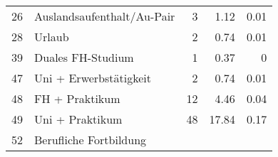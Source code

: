 \begin{longtable}{lXrrr}
     26 &
     \multicolumn{1}{X}{ Auslandsaufenthalt/Au-Pair   } &


       \num{3} &
       \num[round-mode=places,round-precision=2]{1,12} &
         \num[round-mode=places,round-precision=2]{0,01} \\

     28 &
     \multicolumn{1}{X}{ Urlaub   } &


       \num{2} &
       \num[round-mode=places,round-precision=2]{0,74} &
         \num[round-mode=places,round-precision=2]{0,01} \\

     39 &
     \multicolumn{1}{X}{ Duales FH-Studium   } &


       \num{1} &
       \num[round-mode=places,round-precision=2]{0,37} &
         \num[round-mode=places,round-precision=2]{0} \\

     47 &
     \multicolumn{1}{X}{ Uni + Erwerbstätigkeit   } &


       \num{2} &
       \num[round-mode=places,round-precision=2]{0,74} &
         \num[round-mode=places,round-precision=2]{0,01} \\

     48 &
     \multicolumn{1}{X}{ FH + Praktikum   } &


       \num{12} &
       \num[round-mode=places,round-precision=2]{4,46} &
         \num[round-mode=places,round-precision=2]{0,04} \\

     49 &
     \multicolumn{1}{X}{ Uni + Praktikum   } &


       \num{48} &
       \num[round-mode=places,round-precision=2]{17,84} &
         \num[round-mode=places,round-precision=2]{0,17} \\

     52 &
     \multicolumn{1}{X}{ Berufliche Fortbildung   } &



\end{longtable}
